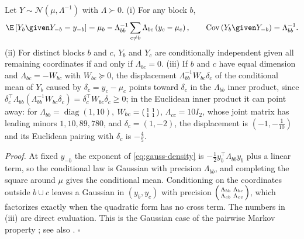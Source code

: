 Let \(Y\sim\mathcal N(\mu,\Lambda^{-1})\) with \(\Lambda\succ0\). (i) For any
block \(b\),
\begin{equation}
\E\left[Y_b\given Y_{-b}=y_{-b}\right]
=\mu_b-\Lambda_{bb}^{-1}\sum_{c\neq b}\Lambda_{bc}\left(y_c-\mu_c\right),
\qquad
\operatorname{Cov}\left(Y_b\given Y_{-b}\right)=\Lambda_{bb}^{-1}.
\label{eq:gauss-conditional}
\end{equation}
(ii) For distinct blocks \(b\) and \(c\), \(Y_b\) and \(Y_c\) are conditionally
independent given all remaining coordinates if and only if
\(\Lambda_{bc}=0\). (iii) If \(b\) and \(c\) have equal dimension and
\(\Lambda_{bc}=-W_{bc}\) with \(W_{bc}\succeq0\), the displacement
\(\Lambda_{bb}^{-1}W_{bc}\delta_c\) of the conditional mean of \(Y_b\) caused
by \(\delta_c=y_c-\mu_c\) points toward \(\delta_c\) in the \(\Lambda_{bb}\)
inner product, since
\(\delta_c^\top\Lambda_{bb}(\Lambda_{bb}^{-1}W_{bc}\delta_c)=\delta_c^\top W_{bc}\delta_c\geq0\);
in the Euclidean inner product it can point away: for
\(\Lambda_{bb}=\operatorname{diag}(1,10)\),
\(W_{bc}=\begin{psmallmatrix}1&1\\1&1\end{psmallmatrix}\),
\(\Lambda_{cc}=10I_2\), whose joint matrix has leading minors \(1,10,89,780\),
and \(\delta_c=(1,-2)\), the displacement is \((-1,-\tfrac1{10})\) and its
Euclidean pairing with \(\delta_c\) is \(-\tfrac45\). 

\noindent\emph{Proof.}
At fixed \(y_{-b}\) the exponent of \eqref{eq:gauss-density} is
\(-\tfrac12y_b^\top\Lambda_{bb}y_b\) plus a linear term, so the conditional law
is Gaussian with precision \(\Lambda_{bb}\), and completing the square around
\(\mu\) gives the conditional mean. Conditioning on the coordinates outside
\(b\cup c\) leaves a Gaussian in \((y_b,y_c)\) with precision
\(\begin{psmallmatrix}\Lambda_{bb}&\Lambda_{bc}\\\Lambda_{cb}&\Lambda_{cc}\end{psmallmatrix}\),
which factorizes exactly when the quadratic form has no cross term. The
numbers in (iii) are direct evaluation. This is the Gaussian case of the
pairwise Markov property \citep[Ch.~5]{Lauritzen1996}; see also
\citet[Ch.~2]{RueHeld2005}. \(\square\)

